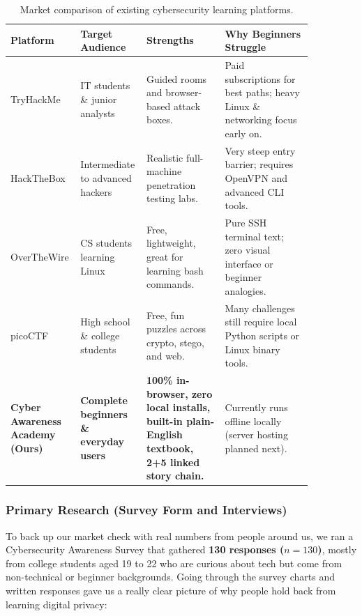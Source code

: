 \documentclass[11pt,a4paper]{article}
\begin{document}
\begin{table}[!htbp]
\centering
\footnotesize
\renewcommand{\arraystretch}{1.3}
\begin{tabular}{|p{0.16\linewidth}|p{0.17\linewidth}|p{0.25\linewidth}|p{0.28\linewidth}|}
\hline
\textbf{Platform} & \textbf{Target Audience} & \textbf{Strengths} & \textbf{Why Beginners Struggle} \\
\hline
TryHackMe & IT students \& junior analysts & Guided rooms and browser-based attack boxes. & Paid subscriptions for best paths; heavy Linux \& networking focus early on. \\
\hline
HackTheBox & Intermediate to advanced hackers & Realistic full-machine penetration testing labs. & Very steep entry barrier; requires OpenVPN and advanced CLI tools. \\
\hline
OverTheWire & CS students learning Linux & Free, lightweight, great for learning bash commands. & Pure SSH terminal text; zero visual interface or beginner analogies. \\
\hline
picoCTF & High school \& college students & Free, fun puzzles across crypto, stego, and web. & Many challenges still require local Python scripts or Linux binary tools. \\
\hline
\textbf{Cyber Awareness Academy (Ours)} & \textbf{Complete beginners \& everyday users} & \textbf{100\% in-browser, zero local installs, built-in plain-English textbook, 2+5 linked story chain.} & Currently runs offline locally (server hosting planned next). \\
\hline
\end{tabular}
\caption{Market comparison of existing cybersecurity learning platforms.}
\label{tab:market_survey}
\end{table}

\subsubsection{Primary Research (Survey Form and Interviews)}
To back up our market check with real numbers from people around us, we ran a Cybersecurity Awareness Survey that gathered \textbf{130 responses ($n = 130$)}, mostly from college students aged 19 to 22 who are curious about tech but come from non-technical or beginner backgrounds. Going through the survey charts and written responses gave us a really clear picture of why people hold back from learning digital privacy:
\end{document}
